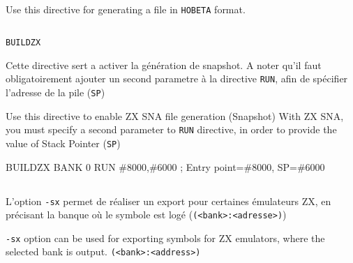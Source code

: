 \begin{xen}
Use this directive for generating a file in \texttt{HOBETA} format. 
\end{xen}

\subsection{}\label{ZXBANK}
\begin{verbatim}
BUILDZX
\end{verbatim}

\begin{xfr}
Cette directive sert a activer la génération de snapshot.
A noter qu'il faut obligatoirement ajouter un second parametre à la directive \texttt{RUN}, afin de spécifier l'adresse de la pile (\texttt{SP})
\end{xfr}

\begin{xen}
Use this directive to enable ZX SNA file generation (Snapshot) 
With ZX SNA, you must specify a second parameter to \texttt{RUN} directive, in order to provide the value of Stack Pointer (\texttt{SP}) 
\end{xen}

\begin{code}
BUILDZX
BANK 0
RUN \#8000,\#6000 ; Entry point=\#8000, SP=\#6000
\end{code}

\subsection{}

\begin{xfr}
L'option \texttt{-sx} permet de réaliser un export pour certaines émulateurs ZX, en précisant la banque où le symbole est logé (\texttt{(<bank>:<adresse>)})
\end{xfr}

\begin{xen}
\texttt{-sx} option can be used for exporting symbols for ZX emulators, where the selected bank is output. \texttt{(<bank>:<address>)}
\end{xen}
